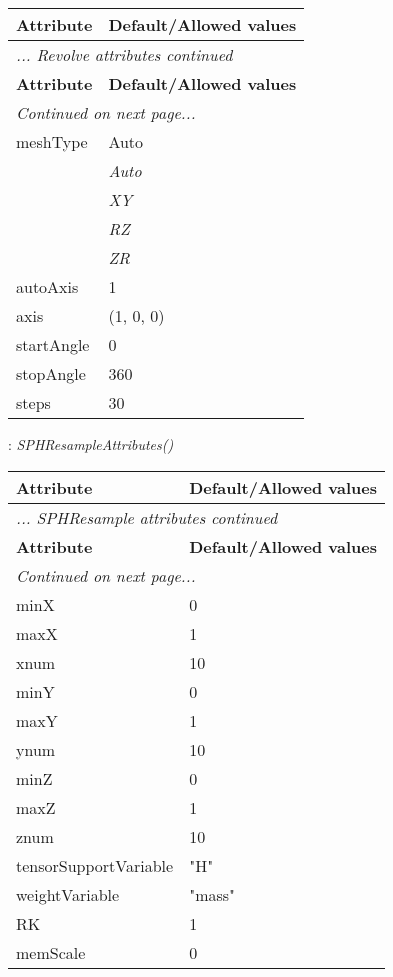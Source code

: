 \documentclass[10pt,a4paper]{report}
\begin{document}
\begin{longtable}{ll}
{\bf Attribute} & {\bf Default/Allowed values} \\
\hline \hline
\endfirsthead
\multicolumn{2}{l}{{\it ... Revolve attributes continued}} \\
{\bf Attribute} & {\bf Default/Allowed values} \\
\hline \hline
\endhead
\hline
\multicolumn{2}{l}{{\it Continued on next page...}} \\
\endfoot
\hline
\endlastfoot

meshType  &  Auto   \\
 & {\it  Auto} \\
 & {\it  XY} \\
 & {\it  RZ} \\
 & {\it  ZR} \\
autoAxis  &  1 \\
axis  &  (1, 0, 0) \\
startAngle  &  0 \\
stopAngle  &  360 \\
steps  &  30 \\
\end{longtable}

\newpage

{}
: {\it SPHResampleAttributes() }\\[-3mm]

\begin{longtable}{ll}
{\bf Attribute} & {\bf Default/Allowed values} \\
\hline \hline
\endfirsthead
\multicolumn{2}{l}{{\it ... SPHResample attributes continued}} \\
{\bf Attribute} & {\bf Default/Allowed values} \\
\hline \hline
\endhead
\hline
\multicolumn{2}{l}{{\it Continued on next page...}} \\
\endfoot
\hline
\endlastfoot

minX  &  0 \\
maxX  &  1 \\
xnum  &  10 \\
minY  &  0 \\
maxY  &  1 \\
ynum  &  10 \\
minZ  &  0 \\
maxZ  &  1 \\
znum  &  10 \\
tensorSupportVariable  &  "H" \\
weightVariable  &  "mass" \\
RK  &  1 \\
memScale  &  0 \\
\end{longtable}
\end{document}
